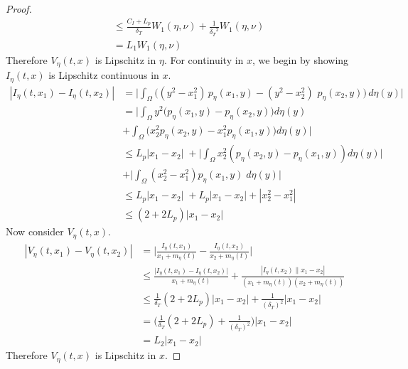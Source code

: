\documentclass[10pt]{article}
\begin{document}
\begin{proof}
\begin{align*}
    &\leq \frac{C_I + L_p}{\delta_T} W_1(\eta,\nu) + \frac{1}{{\delta_T}^2}W_1(\eta,\nu)\\
    &= L_1 W_1(\eta,\nu)
\end{align*}
Therefore $V_\eta(t,x)$ is Lipschitz in $\eta$. For continuity in $x$, we begin by showing $I_\eta(t,x)$ is Lipschitz continuous in $x$.
\begin{align*}
    |I_\eta(t,x_1)- I_\eta(t,x_2)| &= \bigg|\int_{\Omega} \bigg((y^2-x_1^2)\,p_\eta(x_1,y)- (y^2-x_2^2)\,\,p_\eta(x_2,y)\bigg)\,d\eta(y)\bigg|\\
    &=\bigg| \int_{\Omega}y^2\Big(p_\eta(x_1,y)-p_\eta(x_2,y)\Big)d\eta(y)\\& + \int_{\Omega} \Big(x_2^2p_\eta(x_2,y) - x_1^2p_\eta(x_1,y)\Big)d\eta(y)\bigg|\\
    &\leq L_p |x_1 - x_2|\;  + \bigg|\int_{\Omega} x_2^2(p_\eta(x_2,y)-p_\eta(x_1,y)) d\eta(y)\bigg|\\ &+ \bigg|\int_{\Omega}(x^2_2-x_1^2)p_\eta(x_1,y)\;d\eta(y)\bigg|\\
    &\leq L_p |x_1 - x_2|\;  +  L_p |x_1 - x_2| + |x^2_2-x_1^2|\\
    &\leq (2+ 2L_p)|x_1-x_2|
\end{align*}
Now consider $V_\eta(t,x)$.
\begin{align*}
    |V_\eta(t,x_1)- V_\eta(t,x_2)| &= \bigg|\frac{I_\eta(t,x_1)}{x_1+m_{\eta}(t)}- \frac{I_\eta(t,x_2)}{x_2+m_{\eta}(t)}\bigg|\\
    &\leq  \frac{\big|I_\eta(t,x_1)-I_\eta(t,x_2)\big|}{x_1+m_{\eta}(t)}+ \frac{|I_\eta(t,x_2)\|x_1-x_2|}{(x_1+m_{\eta}(t))(x_2+m_\eta(t))}\\
    &\leq \frac{1}{\delta_T}(2+ 2L_p)|x_1-x_2| + \frac{1}{(\delta_T)^2}|x_1-x_2|\\ 
    &= \bigg(\frac{1}{\delta_T}(2+ 2L_p) + \frac{1}{(\delta_T)^2}\bigg)|x_1-x_2|\\
    &=L_2 |x_1-x_2|
\end{align*}
Therefore $V_\eta(t,x)$ is Lipschitz in $x$.
\end{proof}
\end{document}
